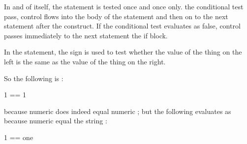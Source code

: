 \documentclass[letterpaper,10pt,english]{sphinxmanual}
\begin{document}
{\begin{sphinxVerbatim}[commandchars=\\\{\}]
 

\end{sphinxVerbatim}

In and of itself, the  statement is tested once and once only.  the conditional test pass, control flows into the body of the  statement and then on to the next statement after the  construct. If the conditional test evaluates as false, control passes immediately to the next statement  the if block.

In the  statement, the \sphinxcode{\sphinxupquote{==}} sign is used to test whether the value of the thing on the left is the same as the value of the thing on the right.

So the following is :

{
\begin{sphinxVerbatim}[commandchars=\\\{\}]
\llap{\color{nbsphinxin}[ ]:\,\hspace{\fboxrule}\hspace{\fboxsep}}1 == 1
\end{sphinxVerbatim}
}

because numeric  does indeed equal numeric ; but the following evaluates as  because numeric   equal the string :

{
\begin{sphinxVerbatim}[commandchars=\\\{\}]
\llap{\color{nbsphinxin}[ ]:\,\hspace{\fboxrule}\hspace{\fboxsep}}1 == \PYGZsq{}one\PYGZsq{}
\end{sphinxVerbatim}
}

}
\end{document}
